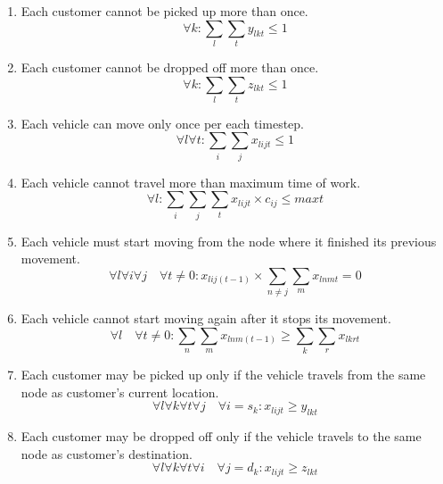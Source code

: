 \documentclass{article}
\begin{document}
\begin{enumerate}
    \item Each customer cannot be picked up more than once.
    \begin{equation}
        \forall k: \sum_l \sum_t y_{lkt} \leq 1 
    \end{equation}
    
    \item Each customer cannot be dropped off more than once.
    \begin{equation}
        \forall k: \sum_l \sum_t z_{lkt} \leq 1 
    \end{equation}

    \item Each vehicle can move only once per each timestep.
    \begin{equation}
        \forall l \forall t: \sum_i \sum_j x_{lijt} \leq 1 
    \end{equation}

    \item Each vehicle cannot travel more than maximum time of work.
    \begin{equation}
        \forall l: \sum_i \sum_j \sum_t x_{lijt} \times c_{ij} \leq maxt 
    \end{equation}
    
    \item Each vehicle must start moving from the node where it finished its previous movement.
    \begin{equation}
        \forall l \forall i \forall j \quad \forall t \neq 0: x_{lij(t-1)} \times \sum_{n \neq j} \sum_m x_{lnmt} = 0
    \end{equation}

    \item Each vehicle cannot start moving again after it stops its movement.
    \begin{equation}
        \forall l \quad \forall t \neq 0: \sum_n \sum_m x_{lnm(t-1)} \geq \sum_k \sum_r x_{lkrt}
    \end{equation}
    
    \item Each customer may be picked up only if the vehicle travels from the same node as customer's current location.
    \begin{equation}
        \forall l \forall k \forall t \forall j \quad \forall i=s_k: x_{lijt} \geq y_{lkt}
    \end{equation}

    \item Each customer may be dropped off only if the vehicle travels to the same node as customer's destination.
    \begin{equation}
        \forall l \forall k \forall t \forall i \quad \forall j=d_k: x_{lijt} \geq z_{lkt}
    \end{equation}


\end{enumerate}
\end{document}

